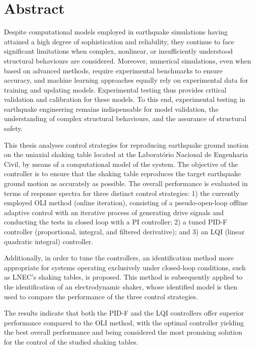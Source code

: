 \documentclass[  10pt, twoside]{report} %
\numberwithin{equation}{chapter}
\begin{document}
\section*{Abstract}

Despite computational models employed in earthquake simulations having attained a high degree of sophistication and reliability, they continue to face significant limitations when complex, nonlinear, or insufficiently understood structural behaviours are considered. Moreover, numerical simulations, even when based on advanced methods, require experimental benchmarks to ensure accuracy, and machine learning approaches equally rely on experimental data for training and updating models. Experimental testing thus provides critical validation and calibration for these models. To this end, experimental testing in earthquake engineering remains indispensable for model validation, the understanding of complex structural behaviours, and the assurance of structural safety.

This thesis analyses control strategies for reproducing earthquake ground motion on the uniaxial shaking table located at the Laboratório Nacional de Engenharia Civil, by means of a computational model of the system. The objective of the controller is to ensure that the shaking table reproduces the target earthquake ground motion as accurately as possible. The overall performance is evaluated in terms of response spectra for three distinct control strategies: 1) the currently employed OLI method (online iteration), consisting of a pseudo-open-loop offline adaptive control with an iterative process of generating drive signals and conducting the tests in closed loop with a PI controller; 2) a tuned PID-F controller (proportional, integral, and filtered derivative); and 3) an LQI (linear quadratic integral) controller.

Additionally, in order to tune the controllers, an identification method more appropriate for systems operating exclusively under closed-loop conditions, such as LNEC's shaking tables, is proposed. This method is subsequently applied to the identification of an electrodynamic shaker, whose identified model is then used to compare the performance of the three control strategies.

The results indicate that both the PID-F and the LQI controllers offer superior performance compared to the OLI method, with the optimal controller yielding the best overall performance and being considered the most promising solution for the control of the studied shaking tables.
\end{document}
